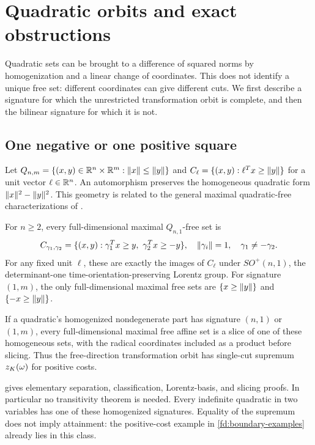\section{Quadratic orbits and exact obstructions}
\label{fd:geometry-section}

Quadratic sets can be brought to a difference of squared norms by
homogenization and a linear change of coordinates. This does not identify
a unique free set: different coordinates can give different cuts. We
first describe a signature for which the unrestricted transformation
orbit is complete, and then the bilinear signature for which it is not.

\subsection{One negative or one positive square}

Let $Q_{n,m}=\{(x,y)\in\mathbb R^n\times\mathbb R^m:\lVert x\rVert\le\lVert y\rVert\}$ and
$C_\ell=\{(x,y):\ell^Tx\ge\lVert y\rVert\}$ for a unit vector $\ell\in\mathbb R^n$.
An automorphism preserves the homogeneous quadratic form
$\lVert x\rVert^2-\lVert y\rVert^2$. This geometry is related to the general maximal
quadratic-free characterizations of \citet{MPS2025,MPS2026}.

\begin{theorem}\label{fd:lorentz}
For $n\ge2$, every full-dimensional maximal $Q_{n,1}$-free set is
\begin{equation}\label{fd:lorentz-pair}
 C_{\gamma_1,\gamma_2}
 =\{(x,y):\gamma_1^Tx\ge y,\ \gamma_2^Tx\ge-y\},
 \quad \lVert\gamma_i\rVert=1,\quad\gamma_1\ne-\gamma_2.
\end{equation}
For any fixed unit $\ell$, these are exactly the images of $C_\ell$
under $SO^+(n,1)$, the determinant-one time-orientation-preserving
Lorentz group. For signature $(1,m)$, the only full-dimensional maximal
free sets are $\{x\ge\lVert y\rVert\}$ and $\{-x\ge\lVert y\rVert\}$.

If a quadratic's homogenized nondegenerate part has signature $(n,1)$
or $(1,m)$, every full-dimensional maximal free affine set is a slice
of one of these homogeneous sets, with the radical coordinates included
as a product before slicing. Thus the free-direction transformation orbit
has single-cut supremum $z_K(\omega)$ for positive costs.
\end{theorem}
 gives elementary separation, classification,
Lorentz-basis, and slicing proofs. In particular no transitivity theorem
is needed. Every indefinite quadratic in two variables has one of these
homogenized signatures. Equality of the supremum does not imply
attainment: the positive-cost example in \cref{fd:boundary-examples}
already lies in this class.

